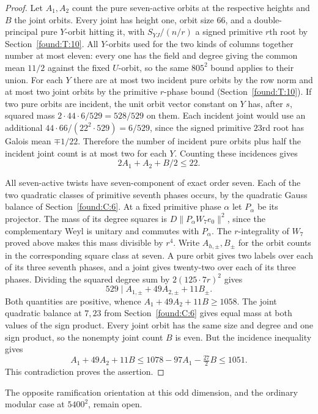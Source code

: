 \documentclass[11pt,a4paper]{article}
\numberwithin{equation}{section}
\theoremstyle{remark}
\begin{document}
\begin{proof}
Let $A_1,A_2$ count the pure seven-active orbits at the respective heights and $B$ the joint orbits. Every joint has height one, orbit size $66$, and a double-principal pure $Y$-orbit hitting it, with $S_{YJ}/(n/r)$ a signed primitive $r$th root by Section~\ref{found:T:10}. All $Y$-orbits used for the two kinds of columns together number at most eleven: every one has the field and degree giving the common mean $11/2$ against the fixed $U$-orbit, so the same $805^2$ bound applies to their union. For each $Y$ there are at most two incident pure orbits by the row norm and at most two joint orbits by the primitive $r$-phase bound (Section~\ref{found:T:10}). If two pure orbits are incident, the unit orbit vector constant on $Y$ has, after $s$, squared mass $2\cdot44\cdot6/529=528/529$ on them. Each incident joint would use an additional $44\cdot66/(22^2\cdot529)=6/529$, since the signed primitive $23$rd root has Galois mean $\mp1/22$. Therefore the number of incident pure orbits plus half the incident joint count is at most two for each $Y$. Counting these incidences gives
\[
                        2 A_1+A_2+B/2\le22.
\]

All seven-active twists have seven-component of exact order seven. Each of the two quadratic classes of primitive seventh phases occurs, by the quadratic Gauss balance of Section~\ref{found:C:6}. At a fixed primitive phase $\alpha$ let $P_\alpha$ be its projector. The mass of its degree squares is $D\|P_\alpha W_7e_0\|^2$, since the complementary Weyl is unitary and commutes with $P_\alpha$. The $r$-integrality of $W_7$ proved above makes this mass divisible by $r^4$. Write $A_{h,\pm},B_\pm$ for the orbit counts in the corresponding square class at seven. A pure orbit gives two labels over each of its three seventh phases, and a joint gives twenty-two over each of its three phases. Dividing the squared degree sum by $2(125\cdot7r)^2$ gives
\[
        529\mid A_{1,\pm}+49 A_{2,\pm}+11 B_\pm .
\]
Both quantities are positive, whence $A_1+49 A_2+11 B\ge1058$. The joint quadratic balance at $7,23$ from Section~\ref{found:C:6} gives equal mass at both values of the sign product. Every joint orbit has the same size and degree and one sign product, so the nonempty joint count $B$ is even. But the incidence inequality gives
\[
 A_1+49 A_2+11B\le1078-97A_1-\tfrac{27}{2}B\le1051 .
\]
This contradiction proves the assertion.
\end{proof}

The opposite ramification orientation at this odd dimension, and the ordinary modular case at $5400^2$, remain open.
\end{document}
